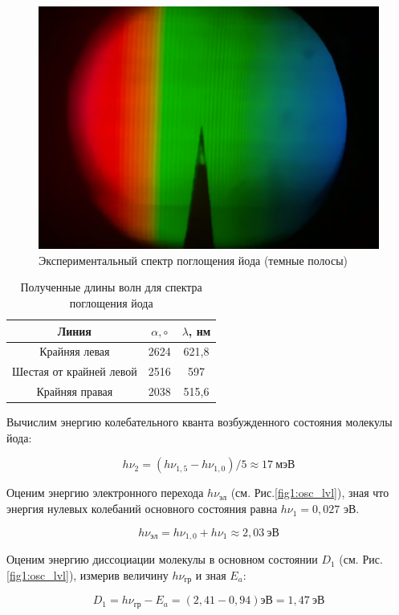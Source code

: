 \documentclass[a4paper,12pt]{article}
\begin{document}
\begin{figure}[h!]
	\centering
	\includegraphics[width=\linewidth]{Iodin_spectre}
	\caption{Экспериментальный спектр поглощения йода (темные полосы)}
\end{figure}	

\begin{table}[h!]
	\centering
	\caption{Полученные длины волн для спектра поглощения йода}
	\label{table2:iodium}
	\begin{tabular}{|c|c|c|}
	\hline
	Линия & $\alpha, \circ$ & $\lambda$, нм \\ \hline
	Крайняя левая & 2624 & 621,8 \\ \hline
	Шестая от крайней левой & 2516 & 597\\ \hline
	Крайняя правая & 2038 & 515,6 \\ \hline
	\end{tabular}
\end{table}

Вычислим энергию колебательного кванта возбужденного состояния молекулы йода:

$$
	h \nu_2 = (h\nu_{1,5} - h \nu_{1,0})/5 \approx 17 \ мэВ
$$

Оценим энергию электронного перехода $h\nu_{эл}$ (см. Рис.\ref{fig1:osc_lvl}), зная что энергия нулевых колебаний основного состояния равна $h \nu_1 = 0,027 $ эВ.

$$
	h\nu_{эл} = h \nu_{1,0} + h\nu_1 \approx 2,03 \ эВ
$$

Оценим энергию диссоциации молекулы в основном состоянии $D_1$ (см. Рис.\ref{fig1:osc_lvl}), измерив величину $h\nu_{гр}$ и зная $E_a$:

$$
	D_1 = h\nu_{гр} - E_a = (2,41 - 0,94) эВ = 1,47 \ эВ
$$
\end{document}
